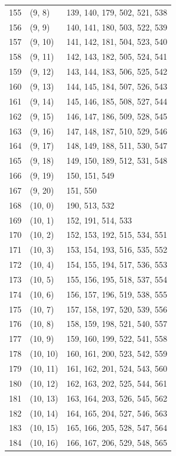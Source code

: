 \documentclass{article}
\begin{document}
\begin{longtable}{lll}
  155 & (9, 8) & 139, 140, 179, 502, 521, 538 \\
  156 & (9, 9) & 140, 141, 180, 503, 522, 539 \\
  157 & (9, 10) & 141, 142, 181, 504, 523, 540 \\
  158 & (9, 11) & 142, 143, 182, 505, 524, 541 \\
  159 & (9, 12) & 143, 144, 183, 506, 525, 542 \\
  160 & (9, 13) & 144, 145, 184, 507, 526, 543 \\
  161 & (9, 14) & 145, 146, 185, 508, 527, 544 \\
  162 & (9, 15) & 146, 147, 186, 509, 528, 545 \\
  163 & (9, 16) & 147, 148, 187, 510, 529, 546 \\
  164 & (9, 17) & 148, 149, 188, 511, 530, 547 \\
  165 & (9, 18) & 149, 150, 189, 512, 531, 548 \\
  166 & (9, 19) & 150, 151, 549 \\
  167 & (9, 20) & 151, 550 \\
  168 & (10, 0) & 190, 513, 532 \\
  169 & (10, 1) & 152, 191, 514, 533 \\
  170 & (10, 2) & 152, 153, 192, 515, 534, 551 \\
  171 & (10, 3) & 153, 154, 193, 516, 535, 552 \\
  172 & (10, 4) & 154, 155, 194, 517, 536, 553 \\
  173 & (10, 5) & 155, 156, 195, 518, 537, 554 \\
  174 & (10, 6) & 156, 157, 196, 519, 538, 555 \\
  175 & (10, 7) & 157, 158, 197, 520, 539, 556 \\
  176 & (10, 8) & 158, 159, 198, 521, 540, 557 \\
  177 & (10, 9) & 159, 160, 199, 522, 541, 558 \\
  178 & (10, 10) & 160, 161, 200, 523, 542, 559 \\
  179 & (10, 11) & 161, 162, 201, 524, 543, 560 \\
  180 & (10, 12) & 162, 163, 202, 525, 544, 561 \\
  181 & (10, 13) & 163, 164, 203, 526, 545, 562 \\
  182 & (10, 14) & 164, 165, 204, 527, 546, 563 \\
  183 & (10, 15) & 165, 166, 205, 528, 547, 564 \\
  184 & (10, 16) & 166, 167, 206, 529, 548, 565 \\

\end{longtable}
\end{document}
